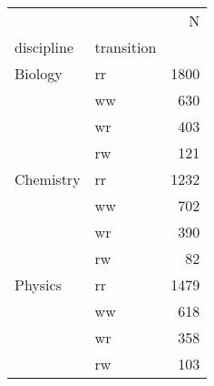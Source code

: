 \begin{tabular}{llr}
\toprule
        &    &     N \\
discipline & transition &       \\
\midrule
Biology & rr &  1800 \\
        & ww &   630 \\
        & wr &   403 \\
        & rw &   121 \\
Chemistry & rr &  1232 \\
        & ww &   702 \\
        & wr &   390 \\
        & rw &    82 \\
Physics & rr &  1479 \\
        & ww &   618 \\
        & wr &   358 \\
        & rw &   103 \\
\bottomrule
\end{tabular}
